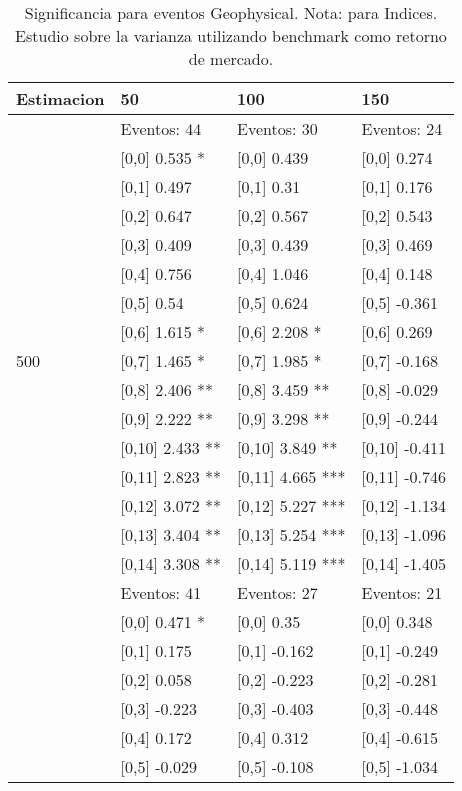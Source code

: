\begin{table}

\caption{Significancia para eventos Geophysical. Nota: para Indices. Estudio sobre la varianza utilizando benchmark como retorno de mercado.}
\centering
\begin{tabular}[t]{llll}
\toprule
Estimacion & 50 & 100 & 150\\
\midrule
 & Eventos:  44 & Eventos:  30 & Eventos:  24\\
 & {}[0,0] 0.535 * & {}[0,0] 0.439 & {}[0,0] 0.274\\
 & {}[0,1] 0.497 & {}[0,1] 0.31 & {}[0,1] 0.176\\
 & {}[0,2] 0.647 & {}[0,2] 0.567 & {}[0,2] 0.543\\
 & {}[0,3] 0.409 & {}[0,3] 0.439 & {}[0,3] 0.469\\
\addlinespace
 & {}[0,4] 0.756 & {}[0,4] 1.046 & {}[0,4] 0.148\\
 & {}[0,5] 0.54 & {}[0,5] 0.624 & {}[0,5] -0.361\\
 & {}[0,6] 1.615 * & {}[0,6] 2.208 * & {}[0,6] 0.269\\
500 & {}[0,7] 1.465 * & {}[0,7] 1.985 * & {}[0,7] -0.168\\
 & {}[0,8] 2.406 ** & {}[0,8] 3.459 ** & {}[0,8] -0.029\\
\addlinespace
 & {}[0,9] 2.222 ** & {}[0,9] 3.298 ** & {}[0,9] -0.244\\
 & {}[0,10] 2.433 ** & {}[0,10] 3.849 ** & {}[0,10] -0.411\\
 & {}[0,11] 2.823 ** & {}[0,11] 4.665 *** & {}[0,11] -0.746\\
 & {}[0,12] 3.072 ** & {}[0,12] 5.227 *** & {}[0,12] -1.134\\
 & {}[0,13] 3.404 ** & {}[0,13] 5.254 *** & {}[0,13] -1.096\\
\addlinespace
 & {}[0,14] 3.308 ** & {}[0,14] 5.119 *** & {}[0,14] -1.405\\
 & Eventos:  41 & Eventos:  27 & Eventos:  21\\
 & {}[0,0] 0.471 * & {}[0,0] 0.35 & {}[0,0] 0.348\\
 & {}[0,1] 0.175 & {}[0,1] -0.162 & {}[0,1] -0.249\\
 & {}[0,2] 0.058 & {}[0,2] -0.223 & {}[0,2] -0.281\\
\addlinespace
 & {}[0,3] -0.223 & {}[0,3] -0.403 & {}[0,3] -0.448\\
 & {}[0,4] 0.172 & {}[0,4] 0.312 & {}[0,4] -0.615\\
 & {}[0,5] -0.029 & {}[0,5] -0.108 & {}[0,5] -1.034\\

\end{tabular}
\end{table}
